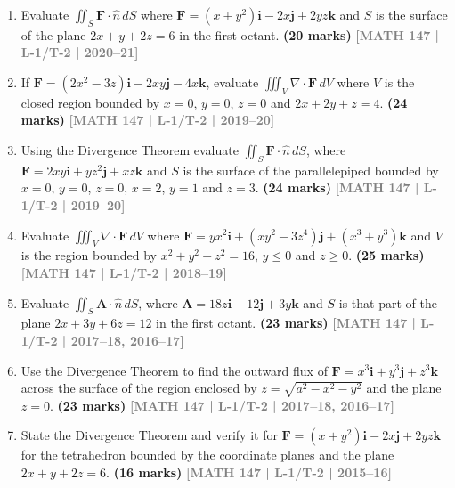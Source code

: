\documentclass[12pt]{article}
\newcommand{\yr}[1]{\hfill\textcolor{gray}{\small\textbf{[#1]}}}
\newcommand{\mk}[1]{\textcolor{orange!70!black}{\small\textbf{(#1 marks)}}}
\begin{document}
\begin{enumerate}
    
    \item Evaluate $\displaystyle\iint_{S}\mathbf{F}\cdot\hat{n}\,dS$ where $\mathbf{F}=(x+y^{2})\mathbf{i}-2x\mathbf{j}+2yz\mathbf{k}$ and $S$ is the surface of the plane $2x+y+2z=6$ in the first octant.
\mk{20} \yr{MATH 147 | L-1/T-2 | 2020--21}

\item If $\mathbf{F}=(2x^{2}-3z)\mathbf{i}-2xy\mathbf{j}-4x\mathbf{k}$, evaluate $\displaystyle\iiint_{V}\nabla\cdot\mathbf{F}\,dV$ where $V$ is the closed region bounded by $x=0$, $y=0$, $z=0$ and $2x+2y+z=4$.
\mk{24} \yr{MATH 147 | L-1/T-2 | 2019--20}

\item Using the Divergence Theorem evaluate $\displaystyle\iint_{S}\mathbf{F}\cdot\hat{n}\,dS$, where $\mathbf{F}=2xy\mathbf{i}+yz^{2}\mathbf{j}+xz\mathbf{k}$ and $S$ is the surface of the parallelepiped bounded by $x=0$, $y=0$, $z=0$, $x=2$, $y=1$ and $z=3$.
\mk{24} \yr{MATH 147 | L-1/T-2 | 2019--20}

\item Evaluate $\displaystyle\iiint_{V}\nabla\cdot\mathbf{F}\,dV$ where $\mathbf{F}=yx^{2}\mathbf{i}+(xy^{2}-3z^{4})\mathbf{j}+(x^{3}+y^{3})\mathbf{k}$ and $V$ is the region bounded by $x^{2}+y^{2}+z^{2}=16$, $y\le 0$ and $z\ge 0$.
\mk{25} \yr{MATH 147 | L-1/T-2 | 2018--19}

\item Evaluate $\displaystyle\iint_{S}\mathbf{A}\cdot\hat{n}\,dS$, where $\mathbf{A}=18z\mathbf{i}-12\mathbf{j}+3y\mathbf{k}$ and $S$ is that part of the plane $2x+3y+6z=12$ in the first octant.
\mk{23} \yr{MATH 147 | L-1/T-2 | 2017--18, 2016--17}

\item Use the Divergence Theorem to find the outward flux of $\mathbf{F}=x^{3}\mathbf{i}+y^{3}\mathbf{j}+z^{3}\mathbf{k}$ across the surface of the region enclosed by $z=\sqrt{a^{2}-x^{2}-y^{2}}$ and the plane $z=0$.
\mk{23} \yr{MATH 147 | L-1/T-2 | 2017--18, 2016--17}

\item State the Divergence Theorem and verify it for $\mathbf{F}=(x+y^{2})\mathbf{i}-2x\mathbf{j}+2yz\mathbf{k}$ for the tetrahedron bounded by the coordinate planes and the plane $2x+y+2z=6$.
\mk{16} \yr{MATH 147 | L-1/T-2 | 2015--16}

\end{enumerate}
\end{document}
